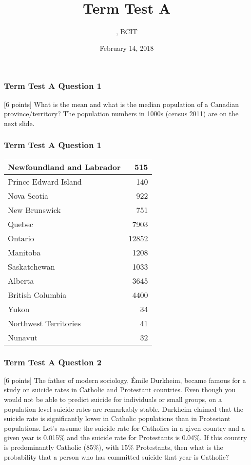 \documentclass[xcolor=dvipsnames]{beamer}
\title{Term Test A}
\subtitle{{\CourseNumber}, BCIT}
\author{\CourseName}
\date{February 14, 2018}
\begin{document}
\begin{frame}
  \titlepage
\end{frame}

\begin{frame}
  \frametitle{Term Test A Question 1}
  [6 points] What is the mean and what is the median population of a
  Canadian province/territory? The population numbers in 1000s (census
  2011) are on the next slide.
\end{frame}

\begin{frame}
  \frametitle{Term Test A Question 1}
\begin{tabular}{|l|r|} \hline
Newfoundland and Labrador & 515   \\ \hline
Prince Edward Island      & 140   \\ \hline
Nova Scotia               & 922   \\ \hline
New Brunswick             & 751   \\ \hline
Quebec                    & 7903  \\ \hline
Ontario                   & 12852 \\ \hline
Manitoba                  & 1208  \\ \hline
Saskatchewan              & 1033  \\ \hline
Alberta                   & 3645  \\ \hline
British Columbia          & 4400  \\ \hline
Yukon                     & 34    \\ \hline
Northwest Territories     & 41    \\ \hline
Nunavut                   & 32    \\ \hline
\end{tabular}
\end{frame}

\begin{frame}
  \frametitle{Term Test A Question 2}
[6 points] The father of modern sociology, {\'E}mile Durkheim,
became famous for a study on suicide rates in Catholic and Protestant
countries. Even though you would not be able to predict suicide for
individuals or small groups, on a population level suicide rates are
remarkably stable. Durkheim claimed that the suicide rate is
significantly lower in Catholic populations than in Protestant
populations. Let's assume the suicide rate for Catholics in a given
country and a given year is 0.015\% and the suicide rate for
Protestants is 0.04\%. If this country is predominantly Catholic
(85\%), with 15\% Protestants, then what is the probability that a
person who has committed suicide that year is Catholic?
\end{frame}
\end{document}
